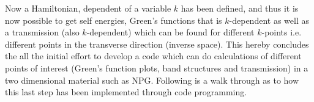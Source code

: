 Now a Hamiltonian, dependent of a variable \(k\) has been defined, and thus it is now possible to get self energies, Green's functions that is \(k\)-dependent as well as a transmission (also \(k\)-dependent) which can be found for different \(k\)-points i.e. different points in the transverse direction (inverse space). This hereby concludes the all the initial effort to develop a code which can do calculations of different points of interest (Green's function plots, band structures and transmission) in a two dimensional material such as NPG. Following is a walk through as to how this last step has been implemented through code programming. 
